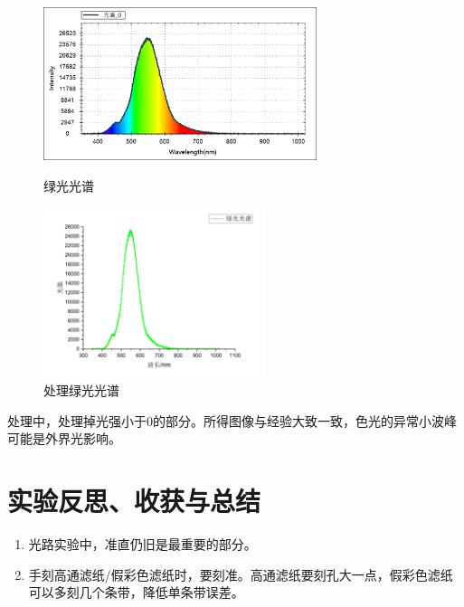 \documentclass[11pt]{article}
\begin{document}
\begin{enumerate}
    \begin{figure}[H]
        \centering
        \begin{minipage}[t]{0.55\linewidth}
            \centering
            \includegraphics[width=8cm]{Fig/24-绿.png}
            \caption{绿光光谱}
        \end{minipage}
        \begin{minipage}[t]{0.44\linewidth}
            \centering
            \includegraphics[width=6.5cm]{Fig/25-绿.png}
            \caption{处理绿光光谱}
        \end{minipage}
    \end{figure}
    \par \hspace*{2em}处理中，处理掉光强小于0的部分。所得图像与经验大致一致，色光的异常小波峰可能是外界光影响。
    
\end{enumerate}
\section{实验反思、收获与总结}
\begin{enumerate}
    \item 光路实验中，准直仍旧是最重要的部分。
    \item 手刻高通滤纸/假彩色滤纸时，要刻准。高通滤纸要刻孔大一点，假彩色滤纸可以多刻几个条带，降低单条带误差。
\end{enumerate}
\end{document}
